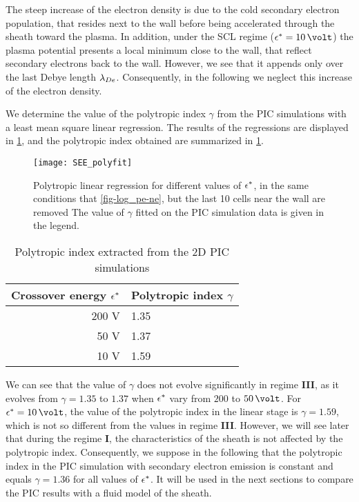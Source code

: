 The steep increase of the electron density is due to the cold secondary electron population, that resides next to the wall before being accelerated through the sheath toward the plasma.
In addition, under the \ac{SCL} regime ($\crover = 10\,\volt$) the plasma potential presents a local minimum close to the wall, that reflect secondary electrons back to the wall.
However, we see that it appends only over the last Debye length $\lambda_{De}$.
Consequently, in the following we neglect this increase of the electron density.

We determine the value of the polytropic index $\gamma$ from the \ac{PIC} simulations with a least mean square linear regression.
The results of the regressions are displayed in \cref{fig-polyfit_see}, and the polytropic index obtained are summarized in \cref{tab-summarygamma}.


\begin{figure}[!htb]
  \centering
  \texttt{[image: SEE\_polyfit]}
  \caption{Polytropic linear regression for different values of $\epsilon^{*}$, in the same conditions that \cref{fig-log_pe-ne}, but the last 10 cells near the wall are removed The value of $\gamma$ fitted on the \acs{PIC} simulation data is given in the legend.}
  \label{fig-polyfit_see}
\end{figure}

\begin{table}[!htb]
  \centering
  \caption{Polytropic index extracted from the \acs{2D}  \acs{PIC} simulations}
  \label{tab-summarygamma}
  \begin{tabular}{@{}r l@{}} \toprule
  Crossover energy $\epsilon^{*}$ & Polytropic index $\gamma$ \\ \midrule
  200 V & 1.35 \\
  50 V & 1.37 \\
  10 V & 1.59 \\
  \bottomrule
  \end{tabular}
\end{table}


We can see that the value of $\gamma$ does not evolve significantly in regime {\bf III}, as it evolves from $\gamma=1.35$  to $1.37$ when $\epsilon^{*}$ vary from $200$ to $50\,\volt$.
For $\crover=10\,\volt$, the value of the polytropic index in the linear stage is $\gamma=1.59$, which is not so different from the values in regime {\bf III}.
However, we will see later that during the regime {\bf I}, the characteristics of the sheath is not affected by the polytropic index. 
Consequently, we suppose in the following that the polytropic index in the \ac{PIC} simulation with secondary electron emission is constant and equals $\gamma=1.36$ for all values of $\epsilon^{*}$.
It will be used in the next sections to compare the \ac{PIC} results with a fluid model of the sheath.



